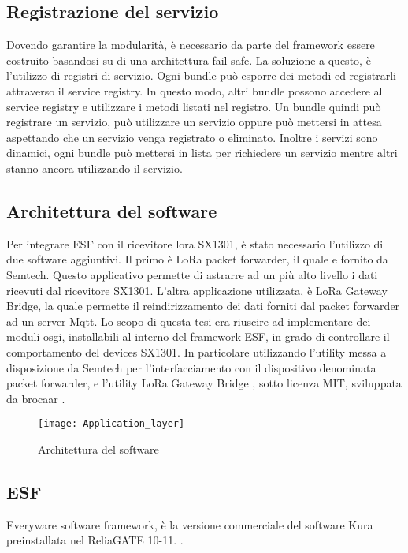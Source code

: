 \subsection{Registrazione del servizio}
Dovendo garantire la modularità, è necessario da parte del framework essere
costruito basandosi su di una architettura fail safe. 
La soluzione a questo, è l'utilizzo di registri di servizio. Ogni bundle può
esporre dei metodi ed registrarli attraverso il service registry. In questo
modo, altri bundle possono accedere al service registry e utilizzare i metodi
listati nel registro. Un bundle quindi può registrare un servizio, può
utilizzare un servizio oppure può mettersi in attesa aspettando che un servizio
venga registrato o eliminato.
Inoltre i servizi sono dinamici, ogni bundle può mettersi in lista per
richiedere un servizio mentre altri stanno ancora utilizzando il servizio.

\subsection{Architettura del software}
Per integrare ESF con il ricevitore lora SX1301, è stato necessario l'utilizzo
di due software aggiuntivi.
Il primo è LoRa packet forwarder, il quale e fornito da Semtech. Questo
applicativo permette di astrarre ad un più alto livello i dati ricevuti dal
ricevitore SX1301.
L'altra applicazione utilizzata, è LoRa Gateway Bridge, la quale permette il
reindirizzamento dei dati forniti dal packet forwarder ad un server Mqtt.
Lo scopo di questa tesi era riuscire ad implementare dei moduli osgi,
installabili al interno del framework ESF, in grado di controllare il
comportamento del devices SX1301. In particolare utilizzando l'utility messa a
disposizione da Semtech per l'interfacciamento con il dispositivo denominata
packet forwarder, e l'utility LoRa Gateway Bridge , sotto licenza MIT,
sviluppata da brocaar .

\begin{figure}[h]
\centering 
\texttt{[image: Application\_layer]}
\caption{Architettura del software}
\label{fig:Software_stack}
\end{figure}
\subsection{ESF}
Everyware software framework, è la versione commerciale del software Kura
preinstallata nel ReliaGATE 10-11. . 

